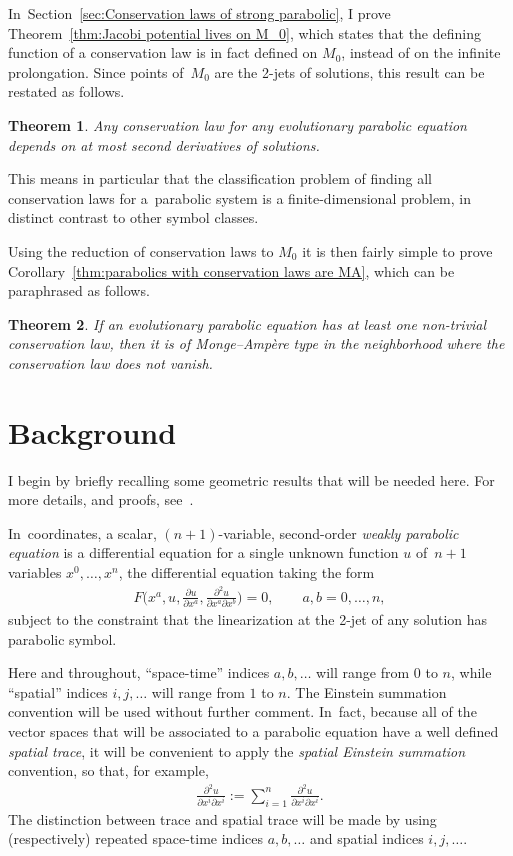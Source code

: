 \documentclass[10pt,a4paper]{amsart}
\newcommand{\pDeriv}[2]{\frac{\partial #1}{\partial #2}}
\numberwithin{equation}{section}
\newtheorem{Theorem}{Theorem}[section]
\begin{document}
In~Section~\ref{sec:Conservation laws of strong parabolic}, I prove
Theorem~\ref{thm:Jacobi potential lives on M_0}, which states that the defining function of a conservation law is in fact defined on $M_0$, instead of on the infinite prolongation. Since points of~$M_0$ are the 2-jets of solutions, this result can be restated as follows.
\begin{Theorem}
 Any conservation law for any evolutionary parabolic equation depends on at most second derivatives of solutions.
\end{Theorem}
This means in particular that the classification problem of finding all conservation laws for a~parabolic system is a finite-dimensional problem, in distinct contrast to other symbol classes.

Using the reduction of conservation laws to $M_0$ it is then fairly simple to prove Corollary~\ref{thm:parabolics with conservation laws are MA}, which can be paraphrased as follows.
\begin{Theorem}
 If an evolutionary parabolic equation has at least one non-trivial conservation law, then it is of Monge--Amp\`ere type in the neighborhood where the conservation law does not vanish.
\end{Theorem}

\section{Background}\label{sec:background}

I begin by briefly recalling some geometric results that will be needed here. For more details, and proofs, see~\cite{McMillan:ParabolicsI}.

In~coordinates, a scalar, $(n+1)$-variable, second-order \emph{weakly parabolic equation} is a differential equation for a single unknown function $u$ of~$n+1$ variables $x^0 , \dots , x^n$, the differential equation taking the form
\begin{gather}\label{eq: generic second order diffeq}
 F\bigg(x^a,u,\pDeriv{u}{x^a},\pDeriv{^2 u}{x^a\partial x^b}\bigg) = 0, \qquad a, b = 0,\dots , n ,
\end{gather}
subject to the constraint that the linearization at the 2-jet of any solution has parabolic symbol.

Here and throughout, ``space-time'' indices $a,b,\dots$ will range from $0$ to $n$, while ``spatial'' indices $i,j,\dots$ will range from $1$ to $n$. The Einstein summation convention will be used without further comment. In~fact, because all of the vector spaces that will be associated to a parabolic equation have a well defined \emph{spatial trace}, it will be convenient to apply the \emph{spatial Einstein summation} convention, so that, for example,
\begin{gather*}
\pDeriv{^2u}{x^i\partial x^i} := \sum_{i=1}^n \pDeriv{^2u}{x^i\partial x^i} .
\end{gather*}
The distinction between trace and spatial trace will be made by using (respectively) repeated space-time indices $a, b, \dots$ and spatial indices $i, j, \dots$.
\end{document}
